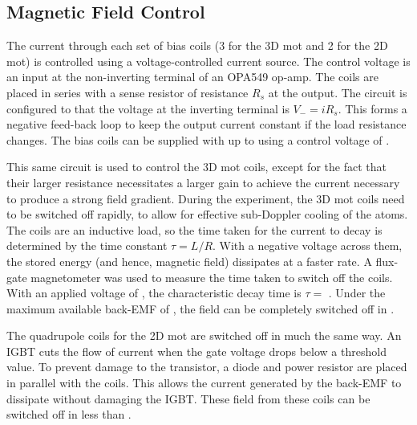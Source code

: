 \subsection{Magnetic Field Control}\label{subsec:coil_control}
The current through each set of bias coils (3 for the 3D \ac{mot} and 2 for the 2D \ac{mot}) is controlled using a voltage-controlled current source. The control voltage is an input at
the non-inverting terminal of an OPA549 op-amp. The coils are placed in series
with a sense resistor of resistance \(R_s\) at the output. The circuit is
configured to that the voltage at the inverting terminal is \(V_- = i R_s\).
This forms a negative feed-back loop to keep the output current constant if the load resistance changes. The bias coils can be supplied with up
to  using a control voltage of .
\par\noindent This same circuit is used to control the 3D \ac{mot} coils, except
for the fact that their larger resistance necessitates a larger gain to achieve
the current necessary to produce a strong field gradient. During the experiment,
the 3D \ac{mot} coils need to be switched off rapidly, to allow for effective
sub-Doppler cooling of the atoms. The coils are an inductive load, so the
time taken for the current to decay is determined by the time constant \(\tau = L/R\). With a negative voltage across them, the stored energy
(and hence, magnetic field) dissipates at a faster rate. A flux-gate magnetometer was
used to measure the time taken to switch off the coils. With an
applied voltage of , the characteristic decay time is \(\tau = \)
. Under the maximum available back-EMF of , the field can be completely switched off in
. \par\noindent The quadrupole coils for the 2D
\ac{mot} are switched off in much the same way. An
IGBT cuts the flow of current when the gate voltage drops below a threshold
value. To
prevent damage to the transistor, a diode and  power resistor
are placed in parallel with the coils. This allows the current generated by the
back-EMF to dissipate without damaging the IGBT. These field from these coils
can be switched off in less than .

